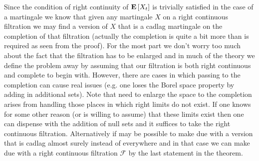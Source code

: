 Since the condition of right continuity of $\textbf{E}\left[X_t\right]$ is
trivially satisfied in the case of a martingale we know that given any
martingale $X$ on a right continuous filtration we may find a version
of $X$ that is a cadlag martingale on the completion of that
filtration (actually the completion is quite a bit more than is required as
seen from the proof).  For the most part we don't worry too much about
the fact that the filtration has to be enlarged and in much of the
theory we define the problem away by assuming that our filtration is
both right continuous and complete to begin with.  However, there are 
cases in which passing to the completion can cause real issues
(e.g. one loses the Borel space property by adding in additional
sets).  Note that need to enlarge the space to the completion arises
from handling
those places in which right limits do not exist.  If one knows for
some other reason
(or is willing to assume) that these limits exist then one can dispense
with the addition of null sets and it suffices to take the right
continuous filtration.  Alternatively if may be possible to make due
with a version that is cadlag almost surely instead of everywhere and in that case we can
make due with a right continuous filtration $\mathcal{F}$ by the last
statement in the theorem.

